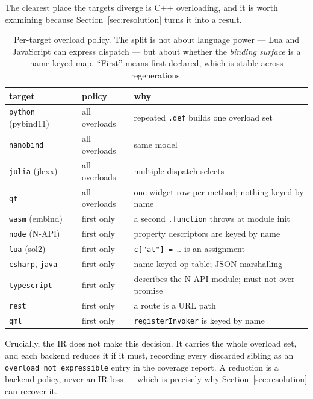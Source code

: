 \documentclass[11pt,a4paper]{article}
\newcommand{\code}[1]{\texttt{\small #1}}
\begin{document}
The clearest place the targets diverge is C++ overloading, and it is worth
examining because Section~\ref{sec:resolution} turns it into a result.

\begin{table}[h]
\centering\small
\begin{tabular}{lll}
\toprule
target & policy & why \\
\midrule
\code{python} (pybind11) & all overloads & repeated \code{.def} builds one overload set \\
\code{nanobind}         & all overloads & same model \\
\code{julia} (jlcxx)    & all overloads & multiple dispatch selects \\
\code{qt}               & all overloads & one widget row per method; nothing keyed by name \\
\midrule
\code{wasm} (embind)    & first only & a second \code{.function} throws at module init \\
\code{node} (N-API)     & first only & property descriptors are keyed by name \\
\code{lua} (sol2)       & first only & \code{c["at"] = \dots} is an assignment \\
\code{csharp}, \code{java} & first only & name-keyed op table; JSON marshalling \\
\code{typescript}       & first only & describes the N-API module; must not over-promise \\
\code{rest}             & first only & a route is a URL path \\
\code{qml}              & first only & \code{registerInvoker} is keyed by name \\
\bottomrule
\end{tabular}
\caption{Per-target overload policy. The split is not about language power ---
Lua and JavaScript can express dispatch --- but about whether the \emph{binding
surface} is a name-keyed map. ``First'' means first-declared, which is stable
across regenerations.}
\label{tab:overloads}
\end{table}

Crucially, the IR does not make this decision. It carries the whole overload
set, and each backend reduces it if it must, recording every discarded sibling
as an \code{overload\_not\_expressible} entry in the coverage report. A
reduction is a backend policy, never an IR loss --- which is precisely why
Section~\ref{sec:resolution} can recover it.

\end{document}
